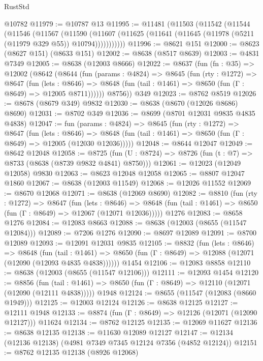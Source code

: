 \begin{lexlean}{RustStd}
\begin{coremodule}
    @10782
@11979 := @10787 @13
@11995 := @11481
    (@11503
      (@11542
        (@11544
          (@11546
            (@11567
              (@11590
                (@11607 (@11625 (@11641 (@11645 (@11978 (@5211 (@11979 @329 @55)) @10794)))))))))))
@11996 := @8621 @151
@12000 := @8623 (@8627 @151) (@8633 @151)
@12002 := @8638 (@8517 @8639)
@12003 := @4831 @7349
@12005 := @8638 (@12003 @8666)
@12022 := @8637
    (fun (fn : @35) =>
    @12002
      (@8642
        (@8644
          (fun (params : @4824) =>
          @8645
            (fun (rty : @1272) =>
            @8647
              (fun (lets : @8646) =>
              @8648 (fun (tail : @1461) => @8650 (fun (Γ : @8649) => @12005 @8711))))))
        @8756))
    @349
@12023 := @8762 @8519
@12026 := @8678 (@8679 @349) @9832
@12030 := @8638 (@8670 (@12026 @8686) @8690)
@12031 := @8702 @349
@12036 := @8699 (@8701 @12031 @9835 @4835 @4838)
@12047 := fun (params : @4824) =>
  @8645
    (fun (rty : @1272) =>
    @8647
      (fun (lets : @8646) =>
      @8648 (fun (tail : @1461) => @8650 (fun (Γ : @8649) => @12005 (@12030 @12036)))))
@12048 := @8644 @12047
@12049 := @8642 @12048
@12058 := @8725 (fun (U : @8724) => @8726 (fun (t : @7) => @8733 (@8638 (@8739 @9832 @4841) @8750)))
@12061 := @12023 (@12049 @12058) @9830
@12063 := @8623 @12048 @12058
@12065 := @8807 @12047 @1860
@12067 := @8638 (@12003 @11549)
@12068 := @12026 @11552
@12069 := @8670 @12068
@12071 := @8638 (@12069 @8690)
@12082 := @8810
    (fun (rty : @1272) =>
    @8647
      (fun (lets : @8646) =>
      @8648 (fun (tail : @1461) => @8650 (fun (Γ : @8649) => @12067 (@12071 @12036)))))
    @1276
@12083 := @8658 @1276
@12084 := @12083 @8663
@12088 := @8638 (@12003 (@8655 (@11547 @12084)))
@12089 := @7206 @1276
@12090 := @8697 @12089
@12091 := @8700 @12089
@12093 := @12091 @12031 @9835
@12105 := @8832
    (fun (lets : @8646) =>
    @8648
      (fun (tail : @1461) =>
      @8650 (fun (Γ : @8649) => @12088 (@12071 (@12090 (@12093 @4835 @4838))))))
    @1454
@12106 := @12083 @8858
@12110 := @8638 (@12003 (@8655 (@11547 @12106)))
@12111 := @12093 @1454
@12120 := @8856
    (fun (tail : @1461) => @8650 (fun (Γ : @8649) => @12110 (@12071 (@12090 (@12111 @4838)))))
    @1948
@12124 := @8655 (@11547 (@12083 (@8660 @1949)))
@12125 := @12003 @12124
@12126 := @8638 @12125
@12127 := @12111 @1948
@12133 := @8874 (fun (Γ : @8649) => @12126 (@12071 (@12090 @12127))) @11624
@12134 := @8762 @12125
@12135 := @12069 @11627
@12136 := @8638 @12135
@12138 := @11630 @12089 @12127
@12147 := @12134 (@12136 @12138) (@4981 @7349 @7345 @12124 @7356 (@4852 @12124))
@12151 := @8762 @12135 @12138 (@8926 @12068)

\end{coremodule}
\end{lexlean}
